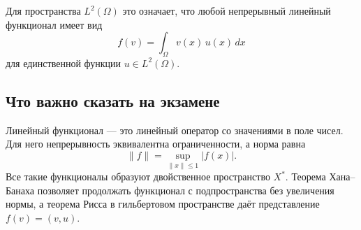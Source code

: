 Для пространства $L^2(\Omega)$ это означает, что любой непрерывный линейный
функционал имеет вид
\[
    f(v)=\int_\Omega v(x)\,u(x)\,dx
\]
для единственной функции $u\in L^2(\Omega)$.

\subsection{Что важно сказать на экзамене}

Линейный функционал --- это линейный оператор со значениями в поле чисел.
Для него непрерывность эквивалентна ограниченности, а норма равна
\[
    \|f\|=\sup_{\|x\|\leq1}|f(x)|.
\]
Все такие функционалы образуют двойственное пространство $X^*$. Теорема
Хана--Банаха позволяет продолжать функционал с подпространства без увеличения
нормы, а теорема Рисса в гильбертовом пространстве даёт представление
$f(v)=(v,u)$.

\newpage
